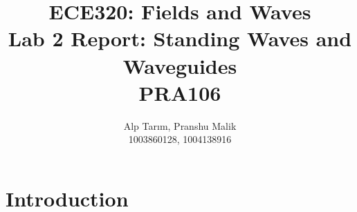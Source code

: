 \documentclass[10pt]{article}
\date{}
\begin{document}
\title{\textbf{\Large{\textsc{ECE320:} Fields and Waves}} \\ \Large{Lab 2 Report: Standing Waves and Waveguides} \\ \textbf{\small{PRA106}}\vspace{-0.3cm}}
\author{Alp Tarım, Pranshu Malik \\ \footnotesize{1003860128}, \footnotesize{1004138916}}

\maketitle

\section{Introduction}
\vspace{-0.3cm}
\end{document}
